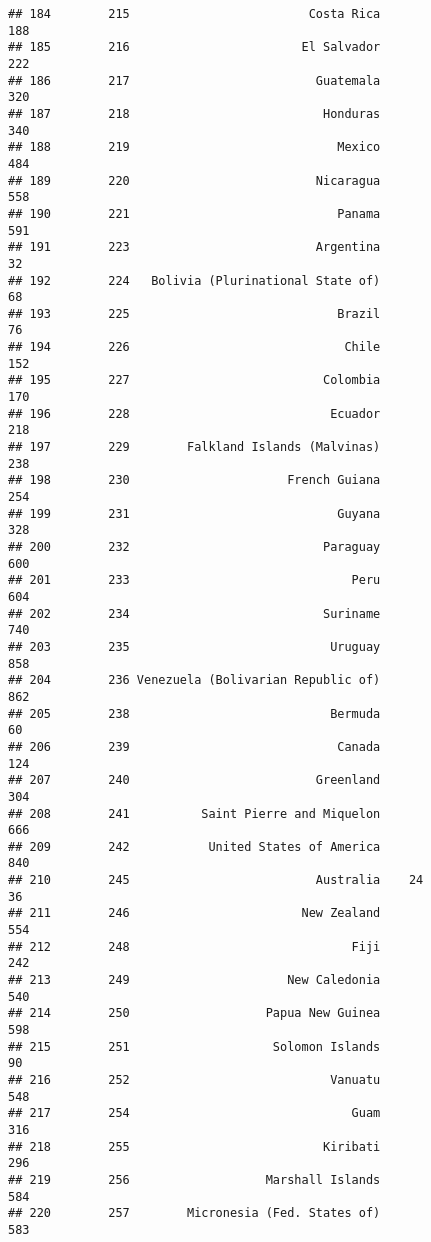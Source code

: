 \documentclass[]{article}
\begin{document}
\begin{verbatim}
## 184        215                         Costa Rica                188
## 185        216                        El Salvador                222
## 186        217                          Guatemala                320
## 187        218                           Honduras                340
## 188        219                             Mexico                484
## 189        220                          Nicaragua                558
## 190        221                             Panama                591
## 191        223                          Argentina                 32
## 192        224   Bolivia (Plurinational State of)                 68
## 193        225                             Brazil                 76
## 194        226                              Chile                152
## 195        227                           Colombia                170
## 196        228                            Ecuador                218
## 197        229        Falkland Islands (Malvinas)                238
## 198        230                      French Guiana                254
## 199        231                             Guyana                328
## 200        232                           Paraguay                600
## 201        233                               Peru                604
## 202        234                           Suriname                740
## 203        235                            Uruguay                858
## 204        236 Venezuela (Bolivarian Republic of)                862
## 205        238                            Bermuda                 60
## 206        239                             Canada                124
## 207        240                          Greenland                304
## 208        241          Saint Pierre and Miquelon                666
## 209        242           United States of America                840
## 210        245                          Australia    24           36
## 211        246                        New Zealand                554
## 212        248                               Fiji                242
## 213        249                      New Caledonia                540
## 214        250                   Papua New Guinea                598
## 215        251                    Solomon Islands                 90
## 216        252                            Vanuatu                548
## 217        254                               Guam                316
## 218        255                           Kiribati                296
## 219        256                   Marshall Islands                584
## 220        257        Micronesia (Fed. States of)                583

\end{verbatim}
\end{document}
